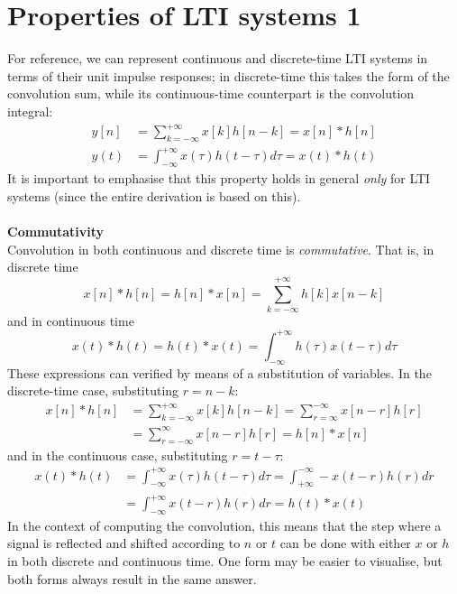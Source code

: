 \documentclass{report}
\begin{document}
\section{Properties of LTI systems 1}
For reference, we can represent continuous and discrete-time LTI systems in terms of their unit impulse responses; in
discrete-time this takes the form of the convolution sum, while its continuous-time counterpart is the convolution integral:
\begin{align*}
y[n]&=\sum^{+\infty}_{k=-\infty}x[k]h[n-k]=x[n]*h[n]\\
y(t)&=\int^{+\infty}_{-\infty}x(\tau)h(t-\tau)d\tau=x(t)*h(t)
\end{align*}
It is important to emphasise that this property holds in general \textit{only} for LTI systems (since the entire derivation
is based on this).\\
\vspace{1mm}\\
\textbf{Commutativity}\\
Convolution in both continuous and discrete time is \textit{commutative}. That is, in discrete time
\begin{equation*}
x[n]*h[n]=h[n]*x[n]=\sum^{+\infty}_{k=-\infty}h[k]x[n-k]
\end{equation*}
and in continuous time
\begin{equation*}
x(t)*h(t)=h(t)*x(t)=\int^{+\infty}_{-\infty}h(\tau)x(t-\tau)d\tau
\end{equation*}
These expressions can verified by means of a substitution of variables. In the discrete-time case, 
substituting $r=n-k$:
\begin{align*}
x[n]*h[n]&=\sum^{+\infty}_{k=-\infty}x[k]h[n-k]=
\sum^{-\infty}_{r=\infty}x[n-r]h[r]\\
&=\sum^{\infty}_{r=-\infty}x[n-r]h[r]=h[n]*x[n]
\end{align*}
and in the continuous case, substituting $r=t-\tau$:
\begin{align*}
x(t)*h(t)&=\int^{+\infty}_{-\infty}x(\tau)h(t-\tau)d\tau
=\int_{+\infty}^{-\infty}-x(t-r)h(r)dr\\
&=\int^{+\infty}_{-\infty}x(t-r)h(r)dr=h(t)*x(t)
\end{align*}
In the context of computing the convolution, this means that the step where a signal is reflected and shifted according to $n$ 
or $t$ can be done with either $x$ or $h$ in both discrete and continuous time.
One form may be easier to visualise, but both forms always result in the same answer.\\
\end{document}
